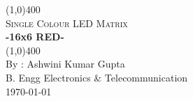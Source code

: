 \begin{titlepage}
		\begin{center}
			\vspace*{1cm}
			\vfill
			\line(1,0){400}\\[1mm]
			\Huge{\textsc{Single Colour LED Matrix}}\\ [3mm]
			\huge{\textbf{-16x6 RED-}}\\ [1mm]
			\line(1,0){400}\\
			\vfill 
			\large{By : Ashwini Kumar Gupta\\
			B. Engg  Electronics \& Telecommunication\\}
			\today\\
			
		\end{center}
\end{titlepage}